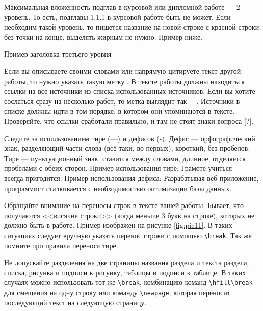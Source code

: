 \documentclass{report}
\begin{document}
Максимальная вложенность подглав в курсовой или дипломной работе --- 2 уровень. То есть, подглавы 1.1.1 в курсовой работе быть не может. Если необходим такой уровень, то пишется название на новой строке с красной строки без точки на конце, выделять жирным не нужно. Пример ниже.

Пример заголовка третьего уровня

Если вы описываете своими словами или напрямую цитируете текст другой работы, то нужно указать такую метку \cite{bib_gost1}. В тексте работы должны находиться ссылки на все источники из списка использованных источников. Если вы хотите сослаться сразу на несколько работ, то метка выглядит так \cite{bib_gost2}---\cite{bib_electr_res}. Источники в списке должны идти в том порядке, в котором они упоминаются в тексте. Проверяйте, что ссылки сработали правильно, и там не стоят знаки вопроса [?].

Следите за использованием тире (---) и дефисов (-). Дефис — орфографический знак, разделяющий части слова (всё-таки, во-первых), короткий, без пробелов.
Тире — пунктуационный знак, ставится между словами, длинное, отделяется пробелами с обеих сторон. Пример использования тире: Грамоте учиться — всегда пригодится. Пример использования дефиса: Разрабатывая веб-приложение, программист сталкивается с необходимостью оптимизации базы данных.

Обращайте внимание на переносы строк в тексте вашей работы. Бывает, что получаются <<висячие строки>> (когда меньше 3 букв на строке), которых не должно быть в работе. Пример изображен на рисунке \ref{fig:pic11}. В таких ситуациях следует вручную указать перенос строки с помощью \verb|\break|. Так же помните про правила переноса тире.



Не допускайте разделения на две страницы названия раздела и текста раздела, списка, рисунка и подписи к рисунку, таблицы и подписи к таблице. В таких случаях можно использовать тот же \verb|\break|, комбинацию команд \verb|\hfill\break| для смещения на одну строку или команду \verb|\newpage|, которая переносит последующий текст на следующую страницу.
\end{document}
